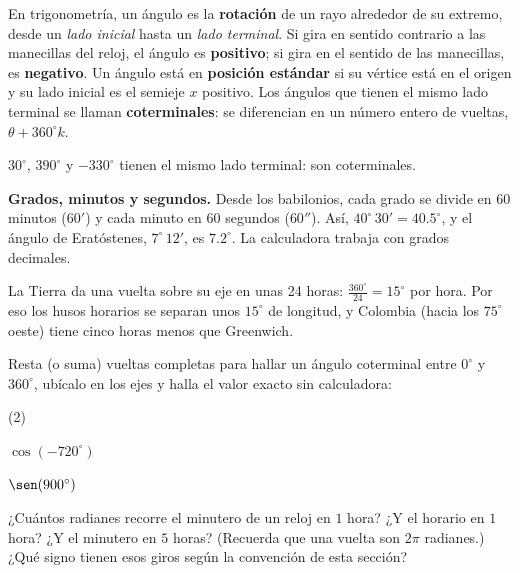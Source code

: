 \documentclass[11pt]{article}
\begin{document}
En trigonometría, un ángulo es la \textbf{rotación} de un rayo alrededor de su
extremo, desde un \emph{lado inicial} hasta un \emph{lado terminal}. Si gira en
sentido contrario a las manecillas del reloj, el ángulo es \textbf{positivo}; si
gira en el sentido de las manecillas, es \textbf{negativo}. Un ángulo está en
\textbf{posición estándar} si su vértice está en el origen y su lado inicial es
el semieje $x$ positivo. Los ángulos que tienen el mismo lado terminal se
llaman \textbf{coterminales}: se diferencian en un número entero de vueltas,
$\theta + 360^\circ k$.

\begin{center}

{\small $30^\circ$, $390^\circ$ y $-330^\circ$ tienen el mismo lado terminal: son coterminales.}
\end{center}

\textbf{Grados, minutos y segundos.} Desde los babilonios, cada grado se divide
en $60$ minutos ($60'$) y cada minuto en $60$ segundos ($60''$). Así,
$40^\circ\,30' = \num{40,5}^\circ$, y el ángulo de Eratóstenes,
$7^\circ\,12'$, es $\num{7,2}^\circ$. La calculadora trabaja con grados decimales.

\begin{aplicacion}
La Tierra da una vuelta sobre su eje en unas 24 horas: $\frac{360^\circ}{24} =
15^\circ$ por hora. Por eso los husos horarios se separan unos $15^\circ$ de
longitud, y Colombia (hacia los $75^\circ$ oeste) tiene cinco horas menos que
Greenwich.
\end{aplicacion}

\begin{preguntas}
\pregunta Resta (o suma) vueltas completas para hallar un ángulo coterminal entre
$0^\circ$ y $360^\circ$, ubícalo en los ejes y halla el valor exacto sin calculadora:
\begin{opciones*}(2)
  \item $\cos(-720^\circ)$
  \item $\sen(900^\circ)$
\end{opciones*}
\espacio{2.5cm}
\pregunta ¿Cuántos radianes recorre el minutero de un reloj en $1$ hora? ¿Y el horario
en $1$ hora? ¿Y el minutero en $5$ horas? (Recuerda que una vuelta son $2\pi$
radianes.) ¿Qué signo tienen esos giros según la convención de esta sección?
\espacio{2.5cm}
\end{preguntas}
\end{document}
